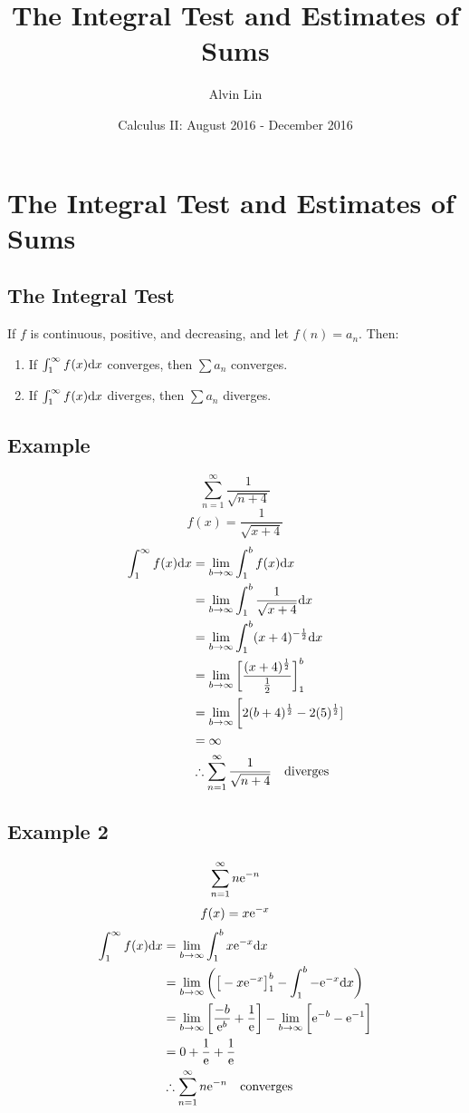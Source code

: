 \documentclass[letterpaper, 12pt]{math}
\title{The Integral Test and Estimates of Sums}
\author{Alvin Lin}
\date{Calculus II: August 2016 - December 2016}
\begin{document}
\maketitle

\section*{The Integral Test and Estimates of Sums}

\subsection*{The Integral Test}
If \( f \) is continuous, positive, and decreasing, and let \( f(n) = a_{n} \).
Then:
\begin{enumerate}
  \item If \( \int_{1}^{\infty}f(x)\mathrm{d}{x} \) converges, then
    \( \sum{a_{n}} \) converges.
  \item If \( \int_{1}^{\infty}f(x)\mathrm{d}{x} \) diverges, then
    \( \sum{a_{n}} \) diverges.
\end{enumerate}

\subsection*{Example}
\[ \sum_{n=1}^{\infty}\frac{1}{\sqrt{n+4}} \]
\[ f(x) = \frac{1}{\sqrt{x+4}} \]
\begin{align*}
  \int_{1}^{\infty}f(x)\mathrm{d}{x} &=
    \lim_{b\to\infty}\int_{1}^{b}f(x)\mathrm{d}{x} \\
  &= \lim_{b\to\infty}\int_{1}^{b}\frac{1}{\sqrt{x+4}}\mathrm{d}{x} \\
  &= \lim_{b\to\infty}\int_{1}^{b}(x+4)^{-\frac{1}{2}}\mathrm{d}{x} \\
  &= \lim_{b\to\infty}\bigg[
    \frac{(x+4)^{\frac{1}{2}}}{\frac{1}{2}}\bigg]_{1}^{b} \\
  &= \lim_{b\to\infty}\bigg[2(b+4)^{\frac{1}{2}}-2(5)^{\frac{1}{2}}] \\
  &= \infty \\
  & \therefore \sum_{n=1}^{\infty}\frac{1}{\sqrt{n+4}} \quad \mathrm{diverges}
\end{align*}

\subsection*{Example 2}
\[ \sum_{n=1}^{\infty}n\mathrm{e}^{-n} \]
\[ f(x) = x\mathrm{e}^{-x} \]
\begin{align*}
  \int_{1}^{\infty}f(x)\mathrm{d}{x} &=
    \lim_{b\to\infty}\int_{1}^{b}x\mathrm{e}^{-x}\mathrm{d}{x} \\
  &= \lim_{b\to\infty}\bigg(\big[-x\mathrm{e}^{-x}\big]_{1}^{b}-
    \int_{1}^{b}-\mathrm{e}^{-x}\mathrm{d}{x}\bigg) \\
  &= \lim_{b\to\infty}\bigg[\frac{-b}{\mathrm{e}^{b}}+\frac{1}{\mathrm{e}}\bigg]-
    \lim_{b\to\infty}\bigg[\mathrm{e}^{-b}-\mathrm{e}^{-1}\bigg] \\
  &= 0+\frac{1}{\mathrm{e}}+\frac{1}{\mathrm{e}} \\
  & \therefore \sum_{n=1}^{\infty}n\mathrm{e}^{-n} \quad \mathrm{converges}
\end{align*}
\end{document}
